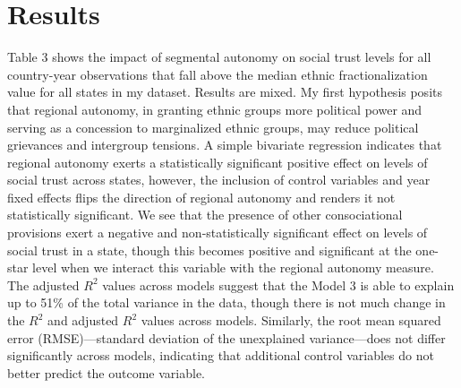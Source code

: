 \documentclass[12pt]{article}
\begin{document}
\section{Results}
Table 3 shows the impact of segmental autonomy on social trust levels for all country-year observations that fall above the median ethnic fractionalization value for all states in my dataset. Results are mixed. My first hypothesis posits that regional autonomy, in granting ethnic groups more political power and serving as a concession to marginalized ethnic groups, may reduce political grievances and intergroup tensions. A simple bivariate regression indicates that regional autonomy exerts a statistically significant positive effect on levels of social trust across states, however, the inclusion of control variables and year fixed effects flips the direction of regional autonomy and renders it not statistically significant. We see that the presence of other consociational provisions exert a negative and non-statistically significant effect on levels of social trust in a state, though this becomes positive and significant at the one-star level when we interact this variable with the regional autonomy measure. The adjusted $R^2$ values across models suggest that the Model 3 is able to explain up to 51\% of the total variance in the data, though there is not much change in the $R^2$ and adjusted $R^2$ values across models. Similarly, the root mean squared error (RMSE)---standard deviation of the unexplained variance---does not differ significantly across models, indicating that additional control variables do not better predict the outcome variable.  
\end{document}
